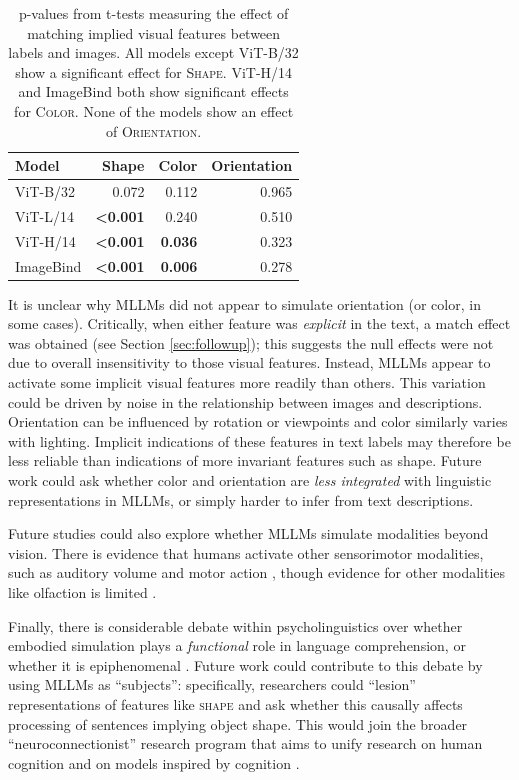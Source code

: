 \documentclass[10pt, a4paper]{article}
\begin{document}
\begin{table}[ht]
\label{tab:results}
\centering
\begin{tabular}{lrrr}
  \hline
Model & Shape & Color & Orientation \\ 
  \hline
ViT-B/32 & 0.072 & 0.112 & 0.965 \\ 
  ViT-L/14 & \textbf{<0.001} & 0.240 & 0.510 \\ 
  ViT-H/14 & \textbf{<0.001} & \textbf{0.036} & 0.323 \\ 
  ImageBind & \textbf{<0.001} & \textbf{0.006} & 0.278 \\ 
   \hline
\end{tabular}
\caption{p-values from t-tests measuring the effect of matching implied visual features between labels and images. All models except ViT-B/32 show a significant effect for \textsc{Shape}. ViT-H/14 and ImageBind both show significant effects for \textsc{Color}. None of the models show an effect of \textsc{Orientation}.} 
\end{table}


It is unclear why MLLMs did not appear to simulate orientation (or color, in some cases). Critically, when either feature was \textit{explicit} in the text, a match effect was obtained (see Section \ref{sec:followup}); this suggests the null effects were not due to overall insensitivity to those visual features. Instead, MLLMs appear to activate some implicit visual features more readily than others.
This variation could be driven by noise in the relationship between images and descriptions. Orientation can be influenced by rotation or viewpoints and color similarly varies with lighting.
Implicit indications of these features in text labels may therefore be less reliable than indications of more invariant features such as shape.
Future work could ask whether color and orientation are \textit{less integrated} with linguistic representations in MLLMs, or simply harder to infer from text descriptions.

Future studies could also explore whether MLLMs simulate modalities beyond vision. There is evidence that humans activate other sensorimotor modalities, such as auditory volume \cite{winter2012language} and motor action \cite{fischer2008embodied}, though evidence for other modalities like olfaction is limited \cite{speed2018exception}. 

Finally, there is considerable debate within psycholinguistics over whether embodied simulation plays a \textit{functional} role in language comprehension, or whether it is epiphenomenal \cite{ostarek2021towards, mahon2008critical, glenberg2008use}. Future work could contribute to this debate by using MLLMs as ``subjects'': specifically, researchers could ``lesion'' representations of features like \textsc{shape} and ask whether this causally affects processing of sentences implying object shape. This would join the broader ``neuroconnectionist'' research program that aims to unify research on human cognition and on models inspired by cognition \cite{doerig2023neuroconnectionist}.
\end{document}
